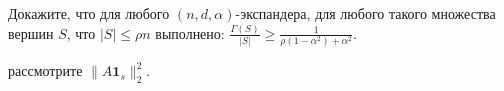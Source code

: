 Докажите, что для любого $(n, d, \alpha)$-экспандера, для любого такого множества вершин $S$, что
$|S| \le \rho n$ выполнено: $\frac{\Gamma(S)}{|S|} \ge
\frac{1}{\rho(1 - \alpha^2) + \alpha^2}$.

 рассмотрите $\| A \mathbf{1}_s \|_2^2$.
